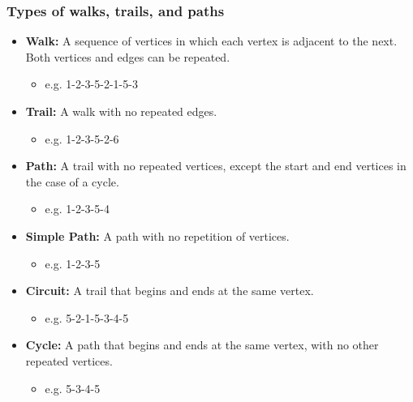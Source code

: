     \subsubsection{Types of walks, trails, and paths}
    \begin{terminology}
        \begin{itemize}
            \item \textbf{Walk:} A sequence of vertices in which each vertex is adjacent to the next. Both vertices and edges can be repeated.
            \begin{itemize}
                \item e.g. 1-2-3-5-2-1-5-3
            \end{itemize}
            
            \item \textbf{Trail:} A walk with no repeated edges.
            \begin{itemize}
                \item e.g. 1-2-3-5-2-6
            \end{itemize}
            
            \item \textbf{Path:} A trail with no repeated vertices, except the start and end vertices in the case of a cycle.
            \begin{itemize}
                \item e.g. 1-2-3-5-4
            \end{itemize}
            
            \item \textbf{Simple Path:} A path with no repetition of vertices.
            \begin{itemize}
                \item e.g. 1-2-3-5
            \end{itemize}
            
            \item \textbf{Circuit:} A trail that begins and ends at the same vertex.
            \begin{itemize}
                \item e.g. 5-2-1-5-3-4-5
            \end{itemize}
            
            \item \textbf{Cycle:} A path that begins and ends at the same vertex, with no other repeated vertices.
            \begin{itemize}
                \item e.g. 5-3-4-5
            \end{itemize}
            
        \end{itemize}
    \end{terminology}


